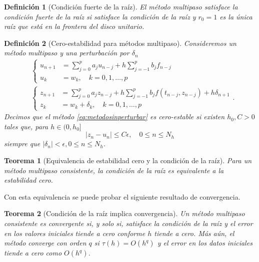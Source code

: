 \documentclass[11pt,letterpaper]{report}
\newtheorem{definition}{Definición}
\newtheorem{theorem}{Teorema}
\begin{document}
\begin{definition}[Condición fuerte de la raíz]
  El método multipaso satisface la \emph{condición fuerte de la raíz}
  si satisface la condición de la raíz y $r_0=1$ es la única raíz que
  está en la frontera del disco unitario.
\end{definition}

\begin{definition}[Cero-estabilidad para métodos multipaso]
  Consideremos un método multipaso y una perturbación por
  $\delta_{n}$
  \begin{align}
    &\left\{
      \begin{aligned}
        u_{n+1}
        &= \sum_{j=0}^{p}a_ju_{n-j}
        + h \sum_{j=-1}^{p} b_jf_{n-j} \\
        u_k &= w_k, \quad k=0,1,\dots,p
      \end{aligned}
    \right.
    \label{eq:metodosinperturbar}
    \\
    &\left\{
      \begin{aligned}
        z_{n+1}
        &= \sum_{j=0}^{p}a_jz_{n-j}
        + h \sum_{j=-1}^{p} b_jf(t_{n-j},z_{n-j}) + h\delta_{n+1} \\
        z_k &= w_k + \delta_k, \quad k=0,1,\dots,p
      \end{aligned}
    \right.
  .\end{align}
  Decimos que el método \eqref{eq:metodosinperturbar}  
  es cero-estable si existen $h_0,C>0$ tales
  que, para $h\in(0,h_0]$
  \begin{equation}
    |z_n-u_n|\leq C\epsilon, \quad 0\leq n\leq N_h
  \end{equation}
  siempre que $|\delta_n|<\epsilon, 0\leq n\leq N_h$.
\end{definition}

\begin{theorem}[Equivalencia de estabilidad cero y la condición de la
  raíz]\label{thm:estabilidad_y_raiz}
  Para un método multipaso consistente, la condición de la raíz es
  equivalente a la estabilidad cero.
\end{theorem}

Con esta equivalencia se puede probar el siguiente resultado de
convergencia.

\begin{theorem}[Condición de la raíz implica convergencia]
  \label{thm:raiz_y_convergencia}
  Un método multipaso consistente es convergente si, y solo si,
  satisface la condición de la raíz y el error en los valores
  iniciales tiende a cero conforme $h$ tiende a cero. Más aún, el
  método converge con orden $q$ si $\tau(h)=O(h^q)$ y el error en los
  datos iniciales tiende a cero como $O(h^q)$.
\end{theorem}
\end{document}

